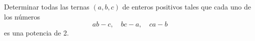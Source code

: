 Determinar todas las ternas $(a,b,c)$ de enteros positivos tales que cada uno de los números
\[ab-c, \quad bc-a,\quad ca-b\]
es una potencia de 2.